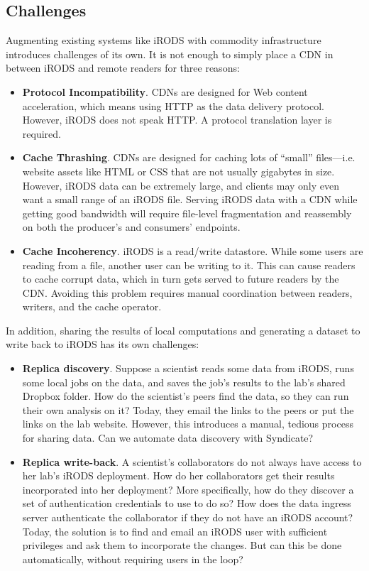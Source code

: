 \subsection{Challenges}

Augmenting existing systems like iRODS
with commodity infrastructure introduces challenges of
its own.  It is not enough to simply place a CDN in between iRODS and remote readers for
three reasons:

\begin{itemize}
\item \textbf{Protocol Incompatibility}.  CDNs are designed for Web content
acceleration, which means
using HTTP as the data delivery protocol.  However,
iRODS does not speak HTTP.  A protocol translation layer is required.
\item \textbf{Cache Thrashing}.  CDNs are designed for caching lots of
``small'' files---i.e. website assets like HTML or CSS that are not usually
gigabytes in size.  However, iRODS data can be extremely large, and clients may
only even want a small range of an iRODS file.  Serving iRODS data with a CDN
while getting good bandwidth will require file-level fragmentation and reassembly
on both the producer's and consumers' endpoints.
\item \textbf{Cache Incoherency}.  iRODS is a read/write datastore.
While some users are reading from a file, another user can be writing to it.
This can cause readers to cache corrupt data, which in turn gets served to
future readers by the CDN.  Avoiding this problem requires manual coordination
between readers, writers, and the cache operator.
\end{itemize}

In addition, sharing the results of local computations and generating a
dataset to write back to iRODS has its own challenges:

\begin{itemize}
\item \textbf{Replica discovery}.  Suppose a scientist reads some data from iRODS,
runs some local jobs on the data, and saves the job's results to the lab's shared Dropbox
folder.  How do the scientist's peers find the data, so they can run their own
analysis on it?  Today, they email the links to the peers or put the links on the lab
website.  However, this introduces a manual, tedious process for sharing data.  Can we
automate data discovery with Syndicate?
\item \textbf{Replica write-back}.  A scientist's collaborators do not always
have access to her lab's iRODS deployment.  How do her collaborators get their results incorporated
into her deployment?  More specifically, how do they discover a set of
authentication credentials to use to do so?  How does the data ingress server authenticate the
collaborator if they do not have an iRODS account?  Today, the solution is to find
and email an iRODS user with sufficient privileges and ask them to incorporate
the changes.  But can this be done automatically, without requiring users
in the loop?
\end{itemize}

